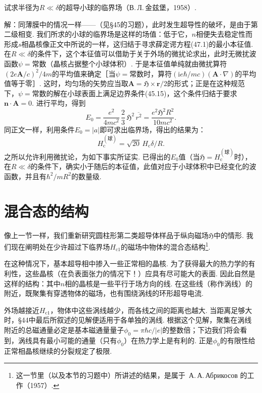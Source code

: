 \begin{xiti}

试求半径为$R\ll\delta$的超导小球的临界场（В.\,Л.\,金兹堡，1958）.

{\heiti 解：}同薄膜中的情况一样——（见§45的习题），此时发生超导性的破坏，是由于第二级相变. 我们所求的小球的临界场是这样的场值：低于它，$n$相便失去稳定性而形成$s$相晶核像正文中所说的一样，这归结于寻求薛定谔方程(47.1)的最小本征值. 在$R\ll\delta$的条件下，这个本征值可以借助于关于外场的微扰论求出，此时无微扰波函数$\psi=$常数（晶核占据整个小球体积）. 于是本征值单纯就由微扰算符$(2e\bm{A}/c)^2/4m$的平均值来确定［当$\psi=$常数时，算符$(\mathrm{i}e\hbar/mc)(\bm{A}\cdot\nabla)$的平均值等于零］. 这时，均匀场的矢势应当取$\bm{A}=\mathfrak{H}\times\bm{r}/2$的形式；正是在这种规范下，$\psi=$常数的解在小球表面上满足边界条件(45.15)，这个条件归结于要求$\bm{n}\cdot\bm{A}=0$. 进行平均，得到
\begin{equation*}
E_0=\frac{e^2}{4mc^2}\,\frac{2}{3}\,\mathfrak{H}^2\,\overline{r^2}
=\frac{e^2\mathfrak{H}^2R^2}{10mc^2}.
\end{equation*}
同正文一样，利用条件$E_0=|a|$即可求出临界场，得出的结果为：
\begin{equation*}
H_{\mathrm{c}}^{(\text{球})}=\sqrt{20}\,H_{\mathrm{c}}\delta/R.
\end{equation*}
之所以允许利用微扰论，为如下事实所证实. 已得出的$E_0$值（当$\mathfrak{H}=H_{\mathrm{c}}^{(\text{球})}$时），在$R\ll\delta$的条件下，确实小于随后的本征值，此值对应于小球体积中已经变化的波函数，并且有$\hbar^2/mR^2$的数量级.

\end{xiti}

\section{混合态的结构}

像上一节一样，我们重新研究圆柱形第二类超导体样品于纵向磁场$\mathfrak{H}$中的情形. 我们现在阐明处在少许超过下临界场$H_{\mathrm{c}1}$的磁场中物体的混合态结构\footnote{这一节里（以及本节的习题中）所讲述的结果，是属于~А.\,А.\,Абрикосов 的工作（1957）.}.

在这种情况下，基本超导相中掺入一些正常相的晶核. 为了获得最大的热力学的有利性，这些晶核（在负表面张力的情况下！）应具有尽可能大的表面. 因此自然是这样的结构：其中$n$相的晶核是一些平行于场方向的线. 在这些线（称作涡线）的附近，既聚集有穿透物体的磁场，也有围绕涡线的环形超导电流.

外场越接近$H_{\mathrm{c}1}$，物体中这些涡线越少，而各线之间的距离也越大. 当距离足够大时，§44中最后所叙述的见解便适用于各单独的涡线. 根据这个见解，聚集在涡线附近的总磁通量必定是基本磁通量量子$\phi_0=\pi\hbar c/|e|$的整数倍；下边我们将会看到，涡线具有最小可能的通量（只有$\phi_0$）在热力学上是有利的. 正是$\phi_0$的有限性给正常相晶核继续的分裂规定了极限.

